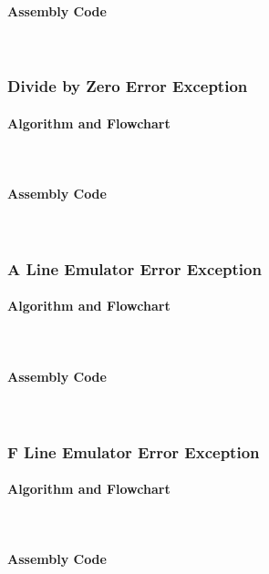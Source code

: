 \documentclass[12pt]{article}
\begin{document}
			\paragraph{Assembly Code}~\\				
			
			\subsubsection{Divide by Zero Error Exception}
			\paragraph{Algorithm and Flowchart}~\\
			\paragraph{Assembly Code}~\\				
			
			\subsubsection{A Line Emulator Error Exception}
			\paragraph{Algorithm and Flowchart}~\\
			\paragraph{Assembly Code}~\\				
			
			\subsubsection{F Line Emulator Error Exception}
			\paragraph{Algorithm and Flowchart}~\\
			\paragraph{Assembly Code}~\\				
			
\end{document}
